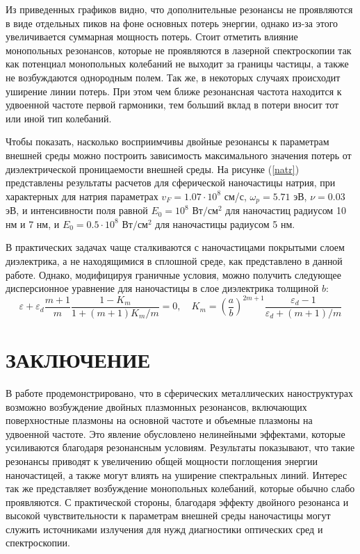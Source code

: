 \documentclass[12pt, a4paper]{article}
\def \eps {\varepsilon}
\def \w {\omega}
\begin{document}
Из приведенных графиков видно, что дополнительные резонансы не проявляются в виде отдельных пиков на фоне основных потерь энергии, однако из-за этого увеличивается суммарная мощность потерь. Стоит отметить влияние монопольных резонансов, которые не проявляются в лазерной спектроскопии так как потенциал монопольных колебаний не выходит за границы частицы, а также не возбуждаются однородным полем. Так же, в некоторых случаях происходит уширение линии потерь. При этом чем ближе резонансная частота находится к удвоенной частоте первой гармоники, тем больший вклад в потери вносит тот или иной тип колебаний.

Чтобы показать, насколько восприимчивы двойные резонансы к параметрам внешней среды можно построить зависимость максимального значения потерь от диэлектрической проницаемости внешней среды. На рисунке (\ref{natr}) представлены результаты расчетов для сферической наночастицы натрия, при характерных для натрия параметрах $v_F = 1.07\cdot10^8$ см/с, $\w_p = 5.71$ эВ, $\nu = 0.03$ эВ, и интенсивности поля равной $E_0=10^8$ $\text{Вт}/\text{см}^2$ для наночастиц радиусом 10 нм и 7 нм, и $E_0=0.5 \cdot 10^8$ $\text{Вт}/\text{см}^2$ для наночастицы радиусом 5 нм.

В практических задачах чаще сталкиваются с наночастицами покрытыми слоем диэлектрика, а не находящимися в сплошной среде, как представлено в данной работе. Однако, модифицируя граничные условия, можно получить следующее дисперсионное уравнение для наночастицы в слое диэлектрика толщиной $b$:
\begin{equation} 	
	\eps + \eps_d\frac{m+1}{m}  \frac{1-K_m}{1 + (m+1)K_m/m} = 0, \quad K_m = (\frac{a}{b})^{2m+1} \frac{\eps_d - 1}{\eps_d + (m+1)/m}
\end{equation}

\section{ЗАКЛЮЧЕНИЕ}

В работе продемонстрировано, что в сферических металлических наноструктурах возможно возбуждение двойных плазмонных резонансов, включающих поверхностные плазмоны на основной частоте и объемные плазмоны на удвоенной частоте. Это явление обусловлено нелинейными эффектами, которые усиливаются благодаря резонансным условиям. Результаты показывают, что такие резонансы приводят к увеличению общей мощности поглощения энергии наночастицей, а также могут влиять на уширение спектральных линий. Интерес так же представляет возбуждение монопольных колебаний, которые обычно слабо проявляются. С практической стороны, благодаря эффекту двойного резонанса и высокой чувствительности к параметрам внешней среды наночастицы могут служить источниками излучения для нужд диагностики оптических сред и спектроскопии.
\end{document}
